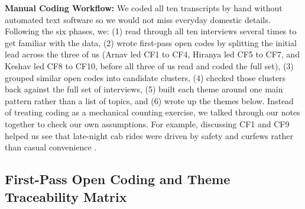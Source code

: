\documentclass[12pt, a4paper]{article}
\begin{document}
\textbf{Manual Coding Workflow:} We coded all ten transcripts by hand without automated text software so we would not miss everyday domestic details. Following the six phases, we: (1) read through all ten interviews several times to get familiar with the data, (2) wrote first-pass open codes by splitting the initial lead across the three of us (Arnav led CF1 to CF4, Hiranya led CF5 to CF7, and Keshav led CF8 to CF10, before all three of us read and coded the full set), (3) grouped similar open codes into candidate clusters, (4) checked those clusters back against the full set of interviews, (5) built each theme around one main pattern rather than a list of topics, and (6) wrote up the themes below. Instead of treating coding as a mechanical counting exercise, we talked through our notes together to check our own assumptions. For example, discussing CF1 and CF9 helped us see that late-night cab rides were driven by safety and curfews rather than casual convenience \cite{cf1, cf9}.

\subsection{First-Pass Open Coding and Theme Traceability Matrix}
\end{document}
